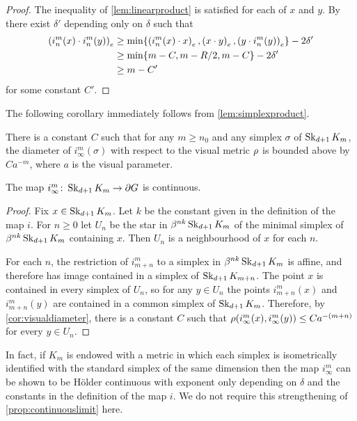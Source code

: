 \documentclass[a4paper]{article}
\begin{document}
\begin{proof}
  The inequality of \cref{lem:linearproduct} is satisfied for each of $x$ 
  and $y$. By~\cite{bridsonhaefliger99} there exist $\delta'$ depending only on 
  $\delta$ such that
  \begin{align*}
    \gromov{e}{i^m_n(x)}{i^m_n(y)} &\geq \min\{\gromov{e}{i^m_n(x)}{x}, 
    \gromov{e}{x}{y}, \gromov{e}{y}{i^m_n(y)}\} - 2\delta'\\
    &\geq \min\{m - C, m - R/2, m - C\} - 2\delta' \\
    &\geq m - C'
  \end{align*}
  for some constant $C'$.
\end{proof}

The following corollary immediately follows from \cref{lem:simplexproduct}.

\begin{corollary}\label{cor:visualdiameter}
  There is a constant $C$ such that for any $m\geq n_0$ and any simplex
  $\sigma$ of $\Skel_{d+1} K_m$, the diameter of $i^m_{\infty}(\sigma)$ with
  respect to the visual metric $\vdistance$ is bounded above by $Ca^{-m}$,
  where $a$ is the visual parameter.
\end{corollary}

\begin{proposition}\label{prop:continuouslimit}
  The map $i^m_\infty\from \Skel_{d+1} K_m \to \boundary G$ is continuous.
\end{proposition}

\begin{proof}
  Fix $x \in \Skel_{d+1} K_m$. Let $k$ be the constant given in the definition 
  of the map $i$. For $n\geq 0$ let $U_n$ be the star in $\beta^{nk} 
  \Skel_{d+1}K_m$ of the minimal simplex of $\beta^{nk}\Skel_{d+1}K_m$ 
  containing $x$. Then $U_n$ is a neighbourhood of $x$ for each $n$. 

  For each $n$, the restriction of $i^m_{m+n}$ to a simplex in 
  $\beta^{nk}\Skel_{d+1}K_m$ is affine, and therefore has image contained in a 
  simplex of $\Skel_{d+1} K_{m+n}$. The point $x$ is contained in every simplex 
  of $U_n$, so for any $y \in U_n$ the points $i^m_{m+n}(x)$ and $i^m_{m+n}(y)$ 
  are contained in a common simplex of $\Skel_{d+1}K_m$. Therefore, by 
  \cref{cor:visualdiameter}, there is a constant $C$ such that 
  $\vdistance(i^m_\infty(x), i^m_\infty(y)) \leq Ca^{-(m+n)}$ for every $y \in 
  U_n$.
\end{proof}

\begin{remark}
  In fact, if $K_m$ is endowed with a metric in which each simplex is 
  isometrically identified with the standard simplex of the same dimension then 
  the map $i^m_\infty$ can be shown to be H\"{o}lder continuous with exponent 
  only depending on $\delta$ and the constants in the definition of the map $i$. 
  We do not require this strengthening of \cref{prop:continuouslimit} 
  here.
\end{remark}
\end{document}
